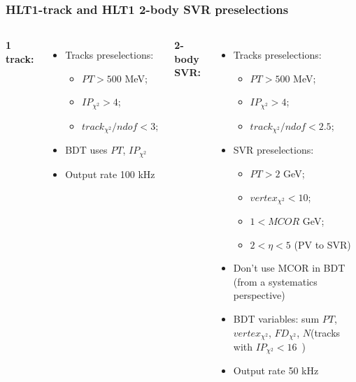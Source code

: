 \documentclass[xcolor=svgnames]{beamer}
\begin{document}
\begin{frame}\frametitle{HLT1-track and HLT1 2-body SVR preselections} 
\begin{columns}[T]
\column{1.7in}
\hspace*{1cm} {\bf 1 track:}
\begin{itemize}
	\item Tracks preselections: 
	      \begin{itemize}
	         \item $PT > 500$ MeV; 
	         \item $IP_{\chi^2} > 4$;
	         \item ${track}_{\chi^2} / ndof < 3;$
	       \end{itemize}
	\item BDT uses $PT$, $IP_{\chi^2}$
	\item Output rate 100 kHz
\end{itemize}
\column{3.2in}
\hspace*{1cm} {\bf 2-body SVR:}
\begin{itemize}
	\item Tracks preselections: 
     	       \begin{itemize}
	         \item $PT > 500$ MeV; 
	         \item $IP_{\chi^2} > 4$;
	         \item $track_{\chi^2}/ndof < 2.5;$
	       \end{itemize}
	\item SVR preselections:
   	      \begin{itemize}
	         \item $PT > 2$ GeV;
	         \item  $vertex_{\chi^2} < 10$;
		\item  $1 < MCOR$ GeV; 
		\item $2 < \eta < 5$ (PV to SVR)
	       \end{itemize}
	\item Don't use MCOR in BDT (from a systematics perspective)
	\item BDT variables: sum $PT$, $vertex_{\chi^2}$, $FD_{\chi^2}$,  $N$(tracks with $IP_{\chi^2}<16$~)
	\item Output rate 50 kHz
\end{itemize}
\end{columns}

\end{frame}
\end{document}
